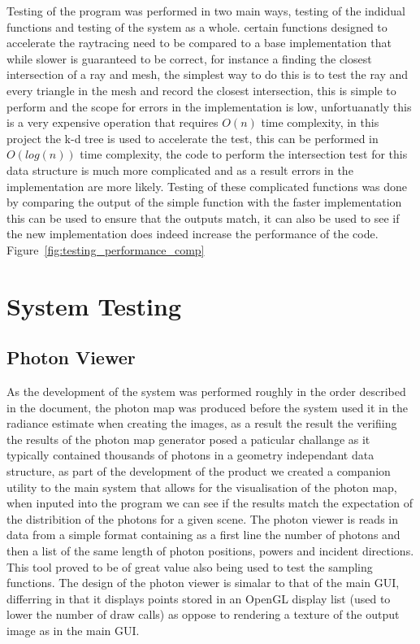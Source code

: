 Testing of the program was performed in two main ways, testing of the indidual functions and testing of the system as a whole.
certain functions designed to accelerate the raytracing need to be compared to a base implementation that while slower is
guaranteed to be correct, for instance a finding the closest intersection of a ray and mesh, the simplest way to do this
is to test the ray and every triangle in the mesh and record the closest intersection, this is simple to perform and
the scope for errors in the implementation is low, unfortuanatly this is a very expensive operation that requires $O(n)$
time complexity, in this project the k-d tree is used to accelerate the test, this can be performed in $O(log(n))$ time
complexity, the code to perform the intersection test for this data structure is much more complicated and as a result
errors in the implementation are more likely. Testing of these complicated functions was done by comparing the output
of the simple function with the faster implementation this can be used to ensure that the outputs match, it can also be
used to see if the new implementation does indeed increase the performance of the code. Figure~\ref{fig:testing_performance_comp}

\section{System Testing}

\subsection{Photon Viewer}
As the development of the system was performed roughly in the order described in the document, the photon map was produced before the
system used it in the radiance estimate when creating the images, as a result the result the verifiing the results of the photon
map generator posed a paticular challange as it typically contained thousands of photons in a geometry independant data structure, as
part of the development of the product we created a companion utility to the main system that allows for the visualisation of the
photon map, when inputed into the program we can see if the results match the expectation of the distribition of the photons for a
given scene. The photon viewer is reads in data from a simple format containing as a first line the number of photons and then
a list of the same length of photon positions, powers and incident directions. This tool proved to be of great value also being used
to test the sampling functions. The design of the photon viewer is simalar to that of the main GUI, differring in that it displays points
stored in an OpenGL display list \cite{khronos:2014:online}  (used to lower the number of draw calls) as oppose to rendering a
texture of the output image as in the main GUI.

